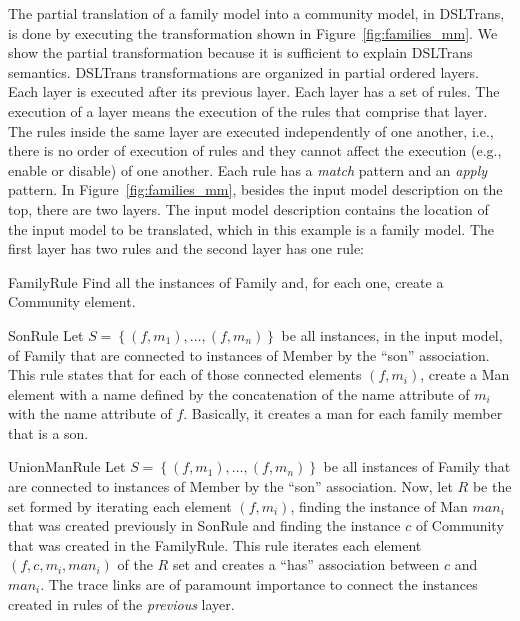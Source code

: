 The partial translation of a family model into a community model, in DSLTrans,
is done by executing the transformation shown in
Figure~\ref{fig:families_mm}.
We show the partial transformation because it is sufficient to explain DSLTrans
semantics. DSLTrans transformations are organized in partial ordered
layers.
Each layer is executed after its previous layer. Each layer has a set of rules.
The execution of a layer means the execution of the rules that comprise that
layer.
The rules inside the same layer are executed independently of one another, i.e.,
there is no order of execution of rules and they cannot affect the execution
(e.g., enable or disable) of one another. Each rule has a \emph{match} pattern and an \emph{apply} pattern.
In Figure~\ref{fig:families_mm}, besides the input model description on the top,
there are two layers. The input model description contains the location of the
input model to be translated, which in this example is a family model. The first layer has two rules and the second layer
has one rule:
\begin{compactdesc}
	\item[FamilyRule] Find all the instances of Family and, for each one, create a Community element.
	\item[SonRule] Let $S = \left\{ (f, m_1) , \ldots , (f, m_n) \right\}$ be all instances, in the input model, of Family that are connected to instances of Member by the ``son'' association. This rule states that for each of those connected elements
$(f, m_i)$, create a Man element with a name defined by the concatenation of the name attribute of $m_i$ with the name attribute of $f$. Basically, it creates a man for each family member that is a son.
	\item[UnionManRule]  Let $S =
	\left\{ (f, m_1) , \ldots , (f, m_n) \right\}$ be all instances of Family that are connected to instances of Member by the ``son'' association.
	Now, let $R$ be the set formed by iterating each element $(f, m_i)$, finding
	the instance of Man ${man}_i$ that was created previously in SonRule and
	finding the instance $c$ of Community that was created in the FamilyRule. This
	rule iterates each element $(f, c, m_i, {man}_i)$ of the $R$ set and creates a
	``has'' association between $c$ and ${man}_i$. The trace links are of paramount importance to connect the instances created
	in rules of the \emph{previous} layer.
\end{compactdesc}

